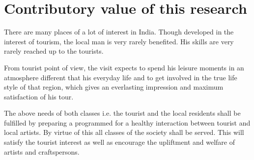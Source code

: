 \section{Contributory value of this research} %
\label{sec:cvalue}

There are many places of a lot of interest in India. Though developed in the interest of tourism, the local man is very rarely benefited. His skills are very rarely reached up to the tourists.

From tourist point of view, the visit expects to spend his leisure moments in an atmosphere different that his everyday life and to get involved in the true life style of that region, which gives an everlasting impression and maximum satisfaction of his tour.

The above needs of both classes i.e. the tourist and the local residents shall be fulfilled by preparing a programmed for a healthy interaction between tourist and local artists. By virtue of this all classes of the society shall be served. This will satisfy the tourist interest as well as encourage the upliftment and welfare of artists and craftspersons.


